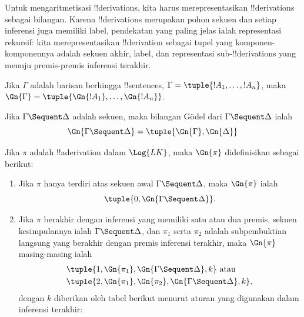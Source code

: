 \documentclass[../../../include/open-logic-section]{subfiles}
\begin{document}

\begin{explain}
Untuk mengaritmetisasi !!{derivation}s, kita harus merepresentasikan
!!{derivation}s sebagai bilangan. Karena !!{derivation}s merupakan pohon sekuen
dan setiap inferensi juga memiliki label, pendekatan yang paling jelas ialah
representasi rekursif: kita merepresentasikan !!{derivation} sebagai tupel yang
komponen-komponennya adalah sekuen akhir, label, dan representasi
sub-!!{derivation}s yang menuju
premis-premis inferensi terakhir.
\end{explain}

\begin{defn}
Jika $\Gamma$ adalah barisan berhingga !!{sentence}s,
$\Gamma = \tuple{!A_1, \dots, !A_n}$, maka
$\Gn{\Gamma} = \tuple{\Gn{!A_1}, \dots, \Gn{!A_n}}$.

Jika $\Gamma \Sequent \Delta$ adalah sekuen, maka bilangan G\"odel dari
$\Gamma \Sequent \Delta$ ialah
\[
\Gn{\Gamma \Sequent \Delta} = \tuple{\Gn{\Gamma}, \Gn{\Delta}}
\]

Jika $\pi$ adalah !!a{derivation} dalam $\Log{LK}$, maka $\Gn{\pi}$
didefinisikan sebagai berikut:
\begin{enumerate}
\item Jika $\pi$ hanya terdiri atas sekuen awal $\Gamma \Sequent \Delta$,
  maka $\Gn{\pi}$ ialah
  \[
    \tuple{0, \Gn{\Gamma \Sequent \Delta}}.
  \]
\item Jika $\pi$ berakhir dengan inferensi yang memiliki satu atau dua premis,
  sekuen kesimpulannya ialah $\Gamma \Sequent \Delta$, dan $\pi_1$ serta
  $\pi_2$ adalah subpembuktian langsung yang berakhir dengan premis inferensi
  terakhir, maka $\Gn{\pi}$ masing-masing ialah
  \begin{align*}
    & \tuple{1, \Gn{\pi_1}, \Gn{\Gamma \Sequent \Delta}, k} \text{ atau}\\
    & \tuple{2, \Gn{\pi_1}, \Gn{\pi_2}, \Gn{\Gamma \Sequent \Delta}, k},
  \end{align*}
  dengan $k$ diberikan oleh tabel berikut menurut aturan yang digunakan dalam
  inferensi terakhir:


\end{enumerate}
\end{defn}
\end{document}
